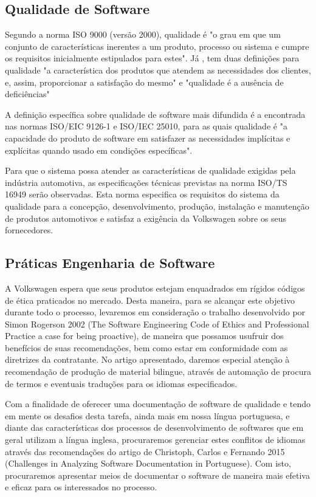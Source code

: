 \documentclass[12pt]{article}
\begin{document}
\subsection{Qualidade de Software}

Segundo a norma ISO 9000 (versão 2000), qualidade é "o grau em que um conjunto de características inerentes a um produto, processo ou sistema e cumpre os requisitos inicialmente estipulados para estes". Já \cite{Juran1998}, tem duas definições para qualidade "a característica dos produtos que atendem as necessidades dos clientes, e, assim, proporcionar a satisfação do mesmo" e "qualidade é a ausência de deficiências"

A definição específica sobre qualidade de software mais difundida é a encontrada nas normas ISO/EIC 9126-1 e ISO/IEC 25010, para as quais qualidade é "a capacidade do produto de software em satisfazer as necessidades implícitas e explícitas quando usado em condições específicas".

Para que o sistema possa atender as características de qualidade exigidas pela indústria automotiva, as especificações técnicas previstas na norma ISO/TS 16949 serão observadas. Esta norma especifica os requisitos do sistema da qualidade para a concepção, desenvolvimento, produção, instalação e manutenção de produtos automotivos e satisfaz a exigência da Volkswagen sobre os seus fornecedores.

\subsection{Práticas Engenharia de Software}

A Volkswagen espera que seus produtos estejam enquadrados em rígidos códigos de ética praticados no mercado. Desta maneira, para se alcançar este objetivo durante todo o processo, levaremos em consideração o trabalho desenvolvido por Simon Rogerson 2002 (The Software Engineering Code of Ethics and Professional Practice a case for being proactive), de maneira que possamos usufruir dos benefícios de suas recomendações, bem como estar em conformidade com as diretrizes da contratante. No artigo apresentado, daremos especial atenção à recomendação de produção de material bilingue, através de automação de procura de termos e eventuais traduções para os idiomas especificados. 

Com a finalidade de oferecer uma documentação de software de qualidade e tendo em mente os desafios desta tarefa, ainda mais em nossa língua portuguesa, e diante das características dos processos de desenvolvimento de softwares que em geral utilizam a língua inglesa, procuraremos gerenciar estes conflitos de idiomas através das recomendações do artigo de Christoph, Carlos e Fernando 2015 (Challenges in Analyzing Software Documentation in Portuguese). Com isto, procuraremos apresentar meios de documentar o software de maneira mais efetiva e eficaz para os interessados no processo.
\end{document}
